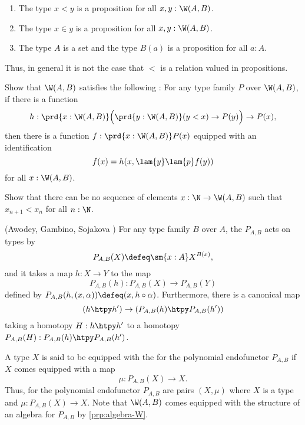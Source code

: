 \begin{exercises}
\begin{subexenum}
    \begin{enumerate}
    \item The type $x<y$ is a proposition for all $x,y:\W(A,B)$.
    \item The type $x\in y$ is a proposition for all $x,y:\W(A,B)$.
    \item The type $A$ is a set and the type $B(a)$ is a proposition for all $a:A$.
    \end{enumerate}
    Thus, in general it is not the case that $<$ is a relation valued in propositions.
  \item Show that $\W(A,B)$ satisfies the following : For any type family $P$ over $\W(A,B)$, if there is a function
    \begin{equation*}
      h:\prd{x:\W(A,B)}\Big(\prd{y:\W(A,B)} (y<x)\to P(y)\Big)\to P(x),
    \end{equation*}
    then there is a function $f:\prd{x:\W(A,B)}P(x)$ equipped with an identification
    \begin{equation*}
      f(x)=h(x,\lam{y}\lam{p}f(y))
    \end{equation*}
    for all $x:\W(A,B)$.
  \item Show that there can be no sequence of elements $x:\N\to\W(A,B)$ such that $x_{n+1}< x_n$ for all $n:\N$.
  \end{subexenum}
  \exitem (Awodey, Gambino, Sojakova \cite{AwodeyGambinoSojakova}) For any type family $B$ over $A$, the  $P_{A,B}$ acts on types by
  \begin{equation*}
    P_{A,B}(X) \defeq \sm{x:A}X^{B(x)},
  \end{equation*}
  and it takes a map $h:X\to Y$ to the map
  \begin{equation*}
    P_{A,B}(h) : P_{A,B}(X)\to P_{A,B}(Y)
  \end{equation*}
  defined by $P_{A,B}(h,(x,\alpha)) \defeq (x,h\circ \alpha)$. Furthermore, there is a canonical map
  \begin{equation*}
    (h\htpy h') \to (P_{A,B}(h)\htpy P_{A,B}(h'))
  \end{equation*}
  taking a homotopy $H:h\htpy h'$ to a homotopy $P_{A,B}(H):P_{A,B}(h)\htpy P_{A,B}(h')$. 

  A type $X$ is said to be equipped with the  for the polynomial endofunctor $P_{A,B}$ if $X$ comes equipped with a map
  \begin{equation*}
    \mu: P_{A,B}(X)\to X.
  \end{equation*}
  Thus,  for the polynomial endofunctor $P_{A,B}$ are pairs $(X,\mu)$ where $X$ is a type and $\mu:P_{A,B}(X)\to X$. Note that $\W(A,B)$ comes equipped with the structure of an algebra for $P_{A,B}$ by \cref{prp:algebra-W}.
  

\end{exercises}
